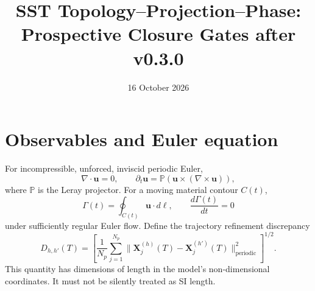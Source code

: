 \documentclass[11pt,a4paper]{article}
\title{SST Topology--Projection--Phase: Prospective Closure Gates after v0.3.0}
\date{16 October 2026}
\begin{document}
\maketitle
\section*{Observables and Euler equation}
For incompressible, unforced, inviscid periodic Euler,
\begin{equation}
\nabla\cdot\mathbf{u}=0,\qquad
\partial_t\mathbf{u}=\mathbb{P}(\mathbf{u}\times(\nabla\times\mathbf{u})),
\end{equation}
where $\mathbb P$ is the Leray projector. For a moving material contour $C(t)$,
\begin{equation}
\Gamma(t)=\oint_{C(t)}\mathbf{u}\cdot d\boldsymbol\ell,
\qquad \frac{d\Gamma(t)}{dt}=0
\end{equation}
under sufficiently regular Euler flow. Define the trajectory refinement discrepancy
\begin{equation}
D_{h,h'}(T)=\left[\frac{1}{N_p}\sum_{j=1}^{N_p}
\|\mathbf{X}^{(h)}_j(T)-\mathbf{X}^{(h')}_j(T)\|_{\mathrm{periodic}}^2\right]^{1/2}.
\end{equation}
This quantity has dimensions of length in the model's non-dimensional coordinates. It must not be silently treated as SI length. 
\end{document}
